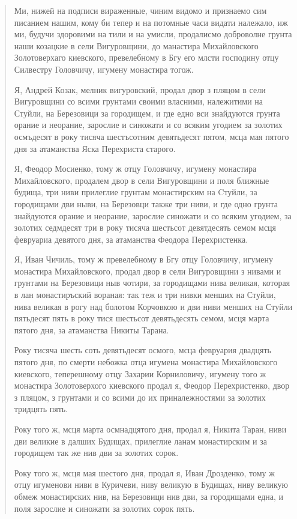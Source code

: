 \begin{quotation}
Ми, нижей на подписи вираженные, чиним видомо и признаемо сим писанием нашим, кому би тепер и на потомные часи видати належало, иж ми, будучи здоровими на тили и на умисли, продалисмо доброволне грунта наши козацкие в сели Вигуровщини, до манастира Михайловского Золотоверхаго киевского, превелебному в Бгу его млсти господину отцу Силвестру Головчичу, игумену монастира тогож. 

Я, Андрей Козак, мелник вигуровский, продал двор з пляцом в сели Вигуровщини со всими грунтами своими власними, належитими на Стуйли, на Березовици за городищем, и где едно вси знайдуются грунта орание и неорание, зарослие и синожати и со всяким угодием за золотих осмъдесят в року тисяча шестъсотним девятьдесят пятом, мсца мая пятого дня за атаманства Яска Перехриста старого.

Я, Феодор Мосиенко, тому ж отцу Головчичу, игумену монастира Михайловского, продалем двор в сели Вигуровщини и поля ближные будища, три ниви прилеглие грунтам монастирским на Cтуйли, за городищами дви ныви, на Березовци также три ниви, и где одно грунта знайдуются орание и неорание, зарослие синожати и со всяким угодием, за золотих седмдесят три в року тисяча шестьсот девятдесять семом мсця февруариа девятого дня, за атаманства Феодора Перехристенка.

Я, Иван Чичиль, тому ж превелебному в Бгу отцу Головчичу, игумену монастира Михайловского, продал двор в сели Вигуровщини з нивами и грунтами на Березовици ныв чотири, за городищами нива великая, которая в лан монастиръский вораная: так теж и три нивки менших на Стуйли, нива великая в рогу над болотом Корчовкою и дви ниви менших на Стуйли пятьдесят пять в року тися шестьсот девятьдесять семом, мсця марта пятого дня, за атаманства Никиты Тарана.

Року тисяча шесть соть девятьдесят осмого, мсца февруария двадцять пятого дня, по смерти небожка отца игумена монастира Михайловского киевского, теперешному отцу Захарии Корниловичу, игумену того ж монастира Золотоверхого киевского продал я, Феодор Перехристенко, двор з пляцом, з грунтами и со всими до их приналежностями за золотих тридцять пять.

Року того ж, мсця марта осмнадцятого дня, продал я, Никита Таран, ниви дви великие в далших Будищах, прилеглие ланам монастирским и за городищем так же нив дви за золотих сорок.

Року того ж, мсця мая шестого дня, продал я, Иван Дрозденко, тому ж отцу игуменови ниви в Куричеви, ниву великую в Будищах, ниву великую обмеж монастирских нив, на Березовици нив дви, за городищами една, и поля зарослие и синожати за золотих сорок пять.


\end{quotation}
